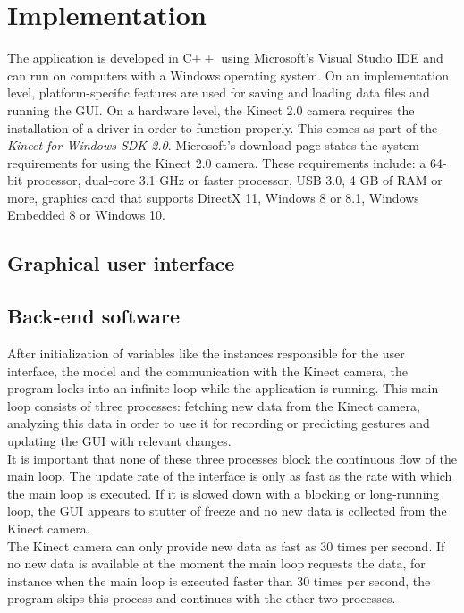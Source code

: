 \chapter{Implementation}

The application is developed in C$++$ using Microsoft's Visual Studio IDE and can run on computers with a Windows operating system. On an implementation level, platform-specific features are used for saving and loading data files and running the GUI. On a hardware level, the Kinect 2.0 camera requires the installation of a driver in order to function properly. This comes as part of the \emph{Kinect for Windows SDK 2.0}. Microsoft's download page states the system requirements for using the Kinect 2.0 camera. These requirements include: a 64-bit processor, dual-core 3.1 GHz or faster processor, USB 3.0, 4 GB of RAM or more, graphics card that supports DirectX 11, Windows 8 or 8.1, Windows Embedded 8 or Windows 10.\\


\section{Graphical user interface}




\section{Back-end software}

After initialization of variables like the instances responsible for the user interface, the model and the communication with the Kinect camera, the program locks into an infinite loop while the application is running. This main loop consists of three processes: fetching new data from the Kinect camera, analyzing this data in order to use it for recording or predicting gestures and updating the GUI with relevant changes.\\

It is important that none of these three processes block the continuous flow of the main loop. The update rate of the interface is only as fast as the rate with which the main loop is executed. If it is slowed down with a blocking or long-running loop, the GUI appears to stutter of freeze and no new data is collected from the Kinect camera.\\

The Kinect camera can only provide new data as fast as 30 times per second. If no new data is available at the moment the main loop requests the data, for instance when the main loop is executed faster than 30 times per second, the program skips this process and continues with the other two processes.\\


